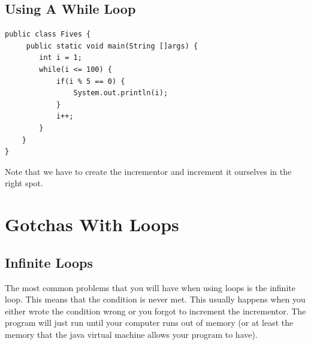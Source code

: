 \documentclass[11]{article}
\begin{document}
\subsection{Using A While Loop}

\begin{lstlisting}
public class Fives {
     public static void main(String []args) {
        int i = 1;
        while(i <= 100) {
            if(i % 5 == 0) {
                System.out.println(i);
            }
            i++;
        }
    }
}
\end{lstlisting}

Note that we have to create the incrementor and increment it ourselves in the right spot.

\section{Gotchas With Loops}
\subsection{Infinite Loops}
The most common problems that you will have when using loops is the infinite loop. This means that the condition is never met. This usually happens when you either wrote the condition wrong or you forgot to increment the incrementor. The program will just run until your computer runs out of memory (or at least the memory that the java virtual machine allows your program to have).
\end{document}
